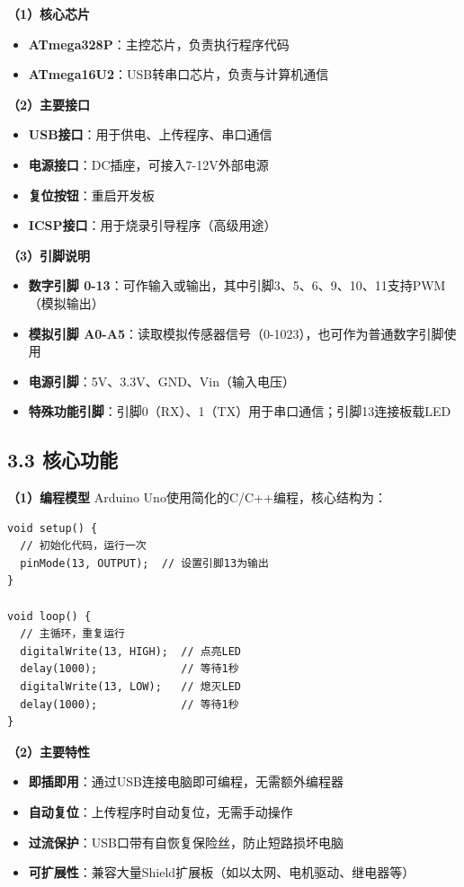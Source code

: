 \documentclass[12pt,a4paper]{article}
\begin{document}
\textbf{（1）核心芯片}
\begin{itemize}[label=--]
    \item \textbf{ATmega328P}：主控芯片，负责执行程序代码
    \item \textbf{ATmega16U2}：USB转串口芯片，负责与计算机通信
\end{itemize}

\textbf{（2）主要接口}
\begin{itemize}[label=--]
    \item \textbf{USB接口}：用于供电、上传程序、串口通信
    \item \textbf{电源接口}：DC插座，可接入7-12V外部电源
    \item \textbf{复位按钮}：重启开发板
    \item \textbf{ICSP接口}：用于烧录引导程序（高级用途）
\end{itemize}

\textbf{（3）引脚说明}
\begin{itemize}[label=--]
    \item \textbf{数字引脚 0-13}：可作输入或输出，其中引脚3、5、6、9、10、11支持PWM（模拟输出）
    \item \textbf{模拟引脚 A0-A5}：读取模拟传感器信号（0-1023），也可作为普通数字引脚使用
    \item \textbf{电源引脚}：5V、3.3V、GND、Vin（输入电压）
    \item \textbf{特殊功能引脚}：引脚0（RX）、1（TX）用于串口通信；引脚13连接板载LED
\end{itemize}

\subsection*{3.3 核心功能}

\textbf{（1）编程模型}
Arduino Uno使用简化的C/C++编程，核心结构为：

\begin{verbatim}
void setup() {
  // 初始化代码，运行一次
  pinMode(13, OUTPUT);  // 设置引脚13为输出
}

void loop() {
  // 主循环，重复运行
  digitalWrite(13, HIGH);  // 点亮LED
  delay(1000);             // 等待1秒
  digitalWrite(13, LOW);   // 熄灭LED
  delay(1000);             // 等待1秒
}
\end{verbatim}

\textbf{（2）主要特性}
\begin{itemize}[label=--]
    \item \textbf{即插即用}：通过USB连接电脑即可编程，无需额外编程器
    \item \textbf{自动复位}：上传程序时自动复位，无需手动操作
    \item \textbf{过流保护}：USB口带有自恢复保险丝，防止短路损坏电脑
    \item \textbf{可扩展性}：兼容大量Shield扩展板（如以太网、电机驱动、继电器等）
\end{itemize}
\end{document}
